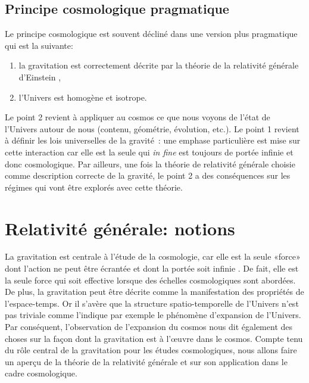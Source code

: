 \subsection{Principe cosmologique pragmatique}
Le principe cosmologique est souvent décliné dans une version plus pragmatique qui est la suivante:
\begin{enumerate}
\item la gravitation est correctement décrite par la théorie de la relativité générale d'Einstein ,
\item l'Univers est homogène et isotrope.
\end{enumerate}
Le point 2 revient à appliquer au cosmos ce que nous voyons de l'état de l'Univers autour de nous (contenu, géométrie, évolution, etc.). Le point 1 revient à définir les lois universelles de la gravité~: une emphase particulière est mise sur cette interaction car elle est la seule qui \textit{in fine} est toujours de portée infinie et donc cosmologique. Par ailleurs, une fois la théorie de relativité générale choisie comme description correcte de la gravité, le point 2 a des conséquences sur les régimes qui vont être explorés avec cette théorie.

\section{Relativité générale: notions}
La gravitation est centrale à l'étude de la cosmologie, car elle est la seule «force» dont l'action ne peut être écrantée et dont la portée soit infinie . De fait, elle est la seule force qui soit effective lorsque des échelles cosmologiques sont abordées. De plus, la gravitation peut être décrite comme la manifestation des propriétés de l'espace-temps. Or il s'avère que la structure spatio-temporelle de l'Univers n'est pas triviale comme l'indique par exemple le phénomène d'expansion de l'Univers. Par conséquent, l'observation de l'expansion du cosmos nous dit également des choses sur la façon dont la gravitation est à l'œuvre dans le cosmos. Compte tenu du rôle central de la gravitation pour les études cosmologiques, nous allons faire un aperçu de la théorie de la relativité générale et sur son application dans le cadre cosmologique.

